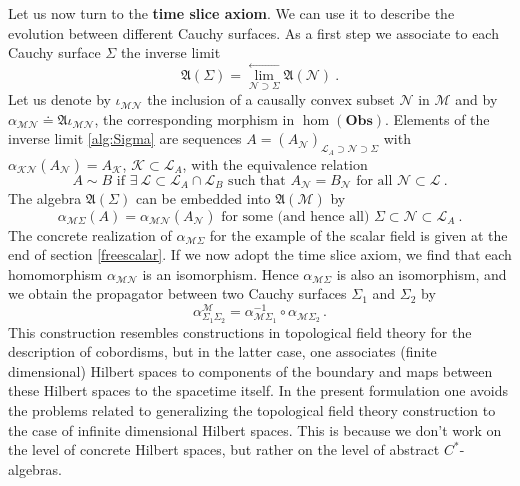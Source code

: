 \documentclass[12pt]{article}
\newcommand{\fA}{\mathfrak{A}}
\newcommand{\Lcal}{\mathcal {L}}
\newcommand{\Kcal}{\mathcal{K}}
\newcommand{\Ncal}{\mathcal{N}}
\newcommand{\Mcal}{\mathcal{M}}
\newcommand{\Obs}{\mathrm{\mathbf{Obs}}}       %
\newcommand{\al}{\alpha}
\newcommand{\1}{\mathds{1}}                         %
\newcommand{\be}{\begin{equation}}
\newcommand{\ee}{\end{equation}}
\begin{document}
Let us now turn to the \textbf{time slice axiom}. We can use it to describe the evolution between different Cauchy surfaces. As a first step we associate to each Cauchy surface $\Sigma$ the inverse limit
\be\label{alg:Sigma}
\mathfrak{A}(\Sigma)=\lim^{\leftarrow}_{\Ncal\supset \Sigma}\mathfrak{A}(\Ncal)\ .
\ee
Let  us denote by $\iota_{\Mcal\Ncal}$ the inclusion of a causally convex subset $\Ncal$ in $\Mcal$ and by $\al_{\Mcal\Ncal}\doteq\fA\iota_{\Mcal\Ncal}$, the corresponding morphism in $\hom(\Obs)$. Elements of the inverse limit \eqref{alg:Sigma} are sequences $A=(A_\Ncal)_{\Lcal_A\supset \Ncal\supset \Sigma}$ with $\alpha_{\Kcal\Ncal}(A_\Ncal)=A_\Kcal$, $\Kcal\subset \Lcal_A$, with the equivalence relation
\be
A\sim B \text{ if }\exists\ \Lcal\subset \Lcal_A\cap \Lcal_{B}\text{ such that }A_\Ncal=B_\Ncal \text{ for all }\Ncal\subset \Lcal\ . 
\ee
The algebra $\mathfrak{A}(\Sigma)$ can be embedded into $\mathfrak{A}(\Mcal)$ by
\be\label{MSig}
\alpha_{\Mcal\Sigma}(A)=\alpha_{\Mcal\Ncal}(A_\Ncal) \text{ for some (and hence all) }\Sigma\subset \Ncal\subset \Lcal_A\ .
\ee
The concrete realization of $\al_{\Mcal\Sigma}$ for the example of the scalar field is given at the end of section \ref{freescalar}. If we now adopt the time slice axiom, we find that each homomorphism $\alpha_{\Mcal\Ncal}$ is an isomorphism. Hence $\alpha_{\Mcal\Sigma}$ is also an isomorphism, and we obtain the propagator between two Cauchy surfaces $\Sigma_1$ and $\Sigma_2$ by
\be
\alpha^\Mcal_{\Sigma_1\Sigma_2}=\alpha_{\Mcal\Sigma_1}^{-1}\circ\alpha_{\Mcal\Sigma_2}\,.
\ee
This construction resembles constructions in topological field theory for the description of cobordisms, but in the latter case, one associates (finite dimensional) Hilbert spaces to components of the boundary and maps between these Hilbert spaces to the spacetime itself. In the present formulation one avoids the problems related to generalizing the topological field theory construction to the case of infinite dimensional Hilbert spaces. This is because we don't work on the level of concrete Hilbert spaces, but rather on the level of abstract $C^*$-algebras. 
\end{document}
